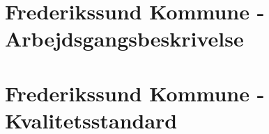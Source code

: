 \appendix
\chapter{Frederikssund Kommune - Arbejdsgangsbeskrivelse} \label{appendix:frederikssund:arbejdsgangsbeskrivelse}


\chapter{Frederikssund Kommune - Kvalitetsstandard} \label{appendix:frederikssund:kvalitetsstandard}


